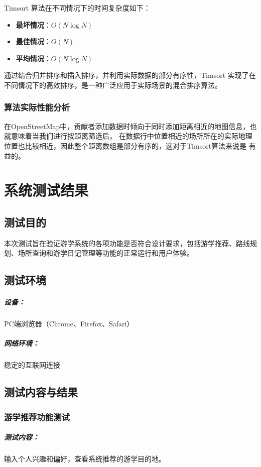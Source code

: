 \documentclass{report}
\begin{document}
Timsort 算法在不同情况下的时间复杂度如下：
\begin{itemize}
    \item \textbf{最坏情况}：$O(N \log N)$
    \item \textbf{最佳情况}：$O(N)$
    \item \textbf{平均情况}：$O(N \log N)$
\end{itemize}

通过结合归并排序和插入排序，并利用实际数据的部分有序性，Timsort 实现了在不同情况下的高效排序，是一种广泛应用于实际场景的混合排序算法。
\subsection{算法实际性能分析}
在OpenStreetMap中，贡献者添加数据时倾向于同时添加距离相近的地图信息，也就意味着当我们进行按距离筛选后，
在数据行中位置相近的场所所在的实际地理位置也比较相近，因此整个距离数组是部分有序的，这对于Timsort算法来说是
有益的。

\chapter{系统测试结果}
\section{测试目的}
本次测试旨在验证游学系统的各项功能是否符合设计要求，包括游学推荐、路线规划、场所查询和游学日记管理等功能的正常运行和用户体验。
\section{测试环境}
\paragraph{设备：}
PC端浏览器（Chrome、Firefox、Safari）
\paragraph{网络环境：}
稳定的互联网连接
\section{测试内容与结果}
\subsection{游学推荐功能测试}
\paragraph{测试内容：}
输入个人兴趣和偏好，查看系统推荐的游学目的地。
\end{document}
